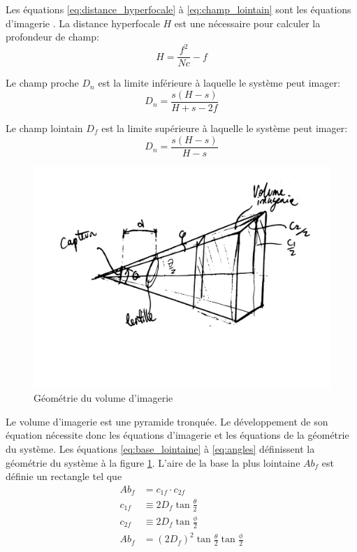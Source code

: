 Les équations \ref{eq:distance_hyperfocale} à \ref{eq:champ_lointain} sont les équations d'imagerie \cite{Photographic_optics}. La distance hyperfocale $H$ est une nécessaire pour calculer la profondeur de champ:
\begin{equation}
    H = \frac{f^2}{Nc} - f
    \label{eq:distance_hyperfocale}
\end{equation}

Le champ proche $D_n$ est la limite inférieure à laquelle le système peut imager:
\begin{equation}
    D_n = \frac{s(H-s)}{H+s-2f}
    \label{eq:champ_proche}
\end{equation}

Le champ lointain $D_f$ est la limite supérieure à laquelle le système peut imager:
\begin{equation}
    D_n = \frac{s(H-s)}{H-s}
    \label{eq:champ_lointain}
\end{equation}

\begin{figure}[!htb]
    \centering
    \includegraphics[width=0.5\linewidth]{fig/camera_custom_geometrie_vect.png}    \caption{Géométrie du volume d'imagerie}
    \label{fig:volume_imagerie}
\end{figure}


Le volume d'imagerie est une pyramide tronquée. Le développement de son équation nécessite donc les équations d'imagerie et les équations de la géométrie du système. Les équations \ref{eq:base_lointaine} à \ref{eq:angles} définissent la géométrie du système à la figure \ref{fig:volume_imagerie}. L'aire de la base la plus lointaine $Ab_f$ est définie un rectangle tel que
\begin{align}
    Ab_f &= c_{1f} \cdot c_{2f}\\
    c_{1f} &\equiv 2D_f \tan{\frac{\theta}{2}}\\
    c_{2f} &\equiv 2D_f \tan{\frac{\phi}{2}}\\
    Ab_f &= (2 D_f)^2 \tan{\frac{\theta}{2}} \tan{\frac{\phi}{2}}
    \label{eq:base_lointaine}
\end{align}

